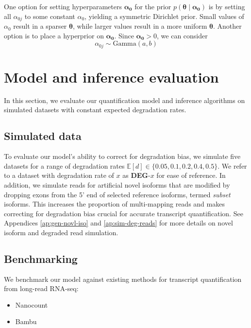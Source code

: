 One option for setting hyperparameters $\bm{\alpha_0}$ for the prior $p(\bm{\theta}\mid\bm{\alpha_0})$ is by setting all $\alpha_{0j}$ to some constant $\alpha_0$, yielding a symmetric Dirichlet prior. Small values of $\alpha_0$ result in a sparser $\bm\theta$, while larger values result in a more uniform $\bm\theta$. Another option is to place a hyperprior on $\bm{\alpha_0}$. Since $\bm{\alpha_0}>0$, we can consider
\begin{equation}
    \alpha_{0j}\sim\textrm{Gamma}(a,b)
\end{equation}


\section{Model and inference evaluation}

In this section, we evaluate our quantification model and inference algorithms on simulated datasets with constant expected degradation rates. 

\subsection{Simulated data}

To evaluate our model's ability to correct for degradation bias, we simulate five datasets for a range of degradation rates $\mathbb{E}[d]\in\{0.05,0.1,0.2,0.4,0.5\}$. We refer to a dataset with degradation rate of $x$ as \textbf{DEG}-$x$ for ease of reference. In addition, we simulate reads for artificial novel isoforms that are modified by dropping exons from the 5' end of selected reference isoforms, termed \textit{subset} isoforms. This increases the proportion of multi-mapping reads and makes correcting for degradation bias crucial for accurate transcript quantification. See Appendices \ref{ap:gen-novl-iso} and \ref{ap:sim-deg-reads} for more details on novel isoform and degraded read simulation. 

\subsection{Benchmarking}

We benchmark our model against existing methods for transcript quantification from long-read RNA-seq:
\begin{itemize}
    \item Nanocount
    \item Bambu
\end{itemize}

